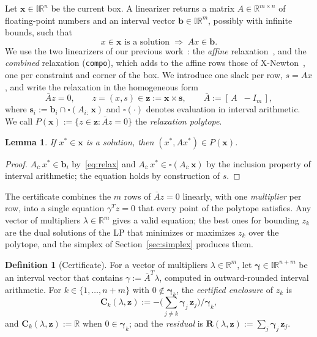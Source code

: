 \documentclass[11pt]{article}
\newcommand{\iv}[1]{\mathbf{#1}}          %
\newcommand{\R}{\mathbb{R}}
\newcommand{\IR}{\mathbb{IR}}
\newcommand{\Abar}{\bar{A}}
\newtheorem{lemma}[proposition]{Lemma}
\theoremstyle{definition}
\newtheorem{definition}[proposition]{Definition}
\theoremstyle{remark}
\begin{document}
Let $\iv{x}\in\IR^n$ be the current box. A linearizer returns a matrix
$A\in\R^{m\times n}$ of floating-point numbers and an interval vector
$\iv{b}\in\IR^m$, possibly with infinite bounds, such that
\begin{equation}\label{eq:relax}
x \in \iv{x} \text{ is a solution} \;\Longrightarrow\; A x \in \iv{b}.
\end{equation}
We use the two linearizers of our previous
work~\cite{araya2025hybridizing}: the \emph{affine}
relaxation~\cite{ninin2015affine}, and the \emph{combined} relaxation
(\texttt{compo}), which adds to the affine rows those of
X-Newton~\cite{araya2012xnewton}, one per constraint and corner of the box.
We introduce one slack per row, $s = Ax$, and write the relaxation in the
homogeneous form
\begin{equation}\label{eq:homog}
\Abar z = 0,\qquad z = (x,s)\in \iv{z} := \iv{x}\times\iv{s},\qquad
\Abar := [\,A \;\; -I_m\,],
\end{equation}
where $\iv{s}_i := \iv{b}_i \cap \square(A_{i:}\,\iv{x})$ and
$\square(\cdot)$ denotes evaluation in interval arithmetic. We call
$P(\iv{x}) := \{ z\in\iv{z} : \Abar z = 0\}$ the \emph{relaxation polytope}.

\begin{lemma}\label{lem:relax}
If $x^*\in\iv{x}$ is a solution, then $(x^*, Ax^*)\in P(\iv{x})$.
\end{lemma}
\begin{proof}
$A_{i:}x^*\in\iv{b}_i$ by~\eqref{eq:relax} and $A_{i:}x^*\in\square(A_{i:}\iv{x})$
by the inclusion property of interval arithmetic; the equation holds by
construction of $s$.
\end{proof}

The certificate combines the $m$ rows of $\Abar z=0$ linearly, with one
\emph{multiplier} per row, into a single equation $\gamma^Tz=0$ that every point
of the polytope satisfies. Any vector of multipliers $\lambda\in\R^m$ gives a
valid equation; the best ones for bounding $z_k$ are the dual solutions of the
LP that minimizes or maximizes $z_k$ over the polytope, and the simplex of Section~\ref{sec:simplex}
produces them.

\begin{definition}[Certificate]\label{def:cert}
For a vector of multipliers $\lambda\in\R^m$, let $\iv{\gamma}\in\IR^{n+m}$ be an interval vector that
contains $\gamma := \Abar^T\lambda$, computed in outward-rounded interval
arithmetic. For $k\in\{1,\dots,n+m\}$ with $0\notin\iv{\gamma}_k$, the
\emph{certified enclosure} of $z_k$ is
\[
\iv{C}_k(\lambda,\iv{z}) := -\Big(\textstyle\sum_{j\neq k}\iv{\gamma}_j\,\iv{z}_j\Big) \Big/ \iv{\gamma}_k ,
\]
and $\iv{C}_k(\lambda,\iv{z}):=\R$ when $0\in\iv{\gamma}_k$;
and the \emph{residual} is $\iv{R}(\lambda,\iv{z}) := \sum_{j}\iv{\gamma}_j\,\iv{z}_j$.
\end{definition}
\end{document}
